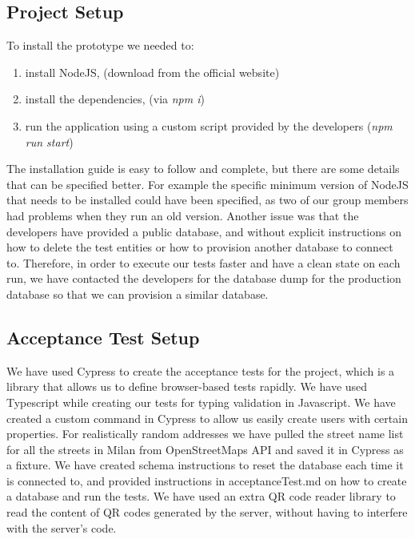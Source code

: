 \subsection{Project Setup}
To install the prototype we needed to:
\begin{enumerate}
    \item install NodeJS, (download from the official website)
    \item install the dependencies, (via \textit{npm i})
    \item run the application using a custom script provided by the developers (\textit{npm run start})
\end{enumerate}
The installation guide is easy to follow and complete, but there are some details that can be specified better.
For example the specific minimum version of NodeJS that needs to be installed could have been specified, as two of our group members had problems when they run an old version.
Another issue was that the developers have provided a public database, and without explicit instructions on how to delete the test entities or how to provision another database to connect to.
Therefore, in order to execute our tests faster and have a clean state on each run, we have contacted the developers for the database dump for the production database so that we can provision a similar database.

\subsection{Acceptance Test Setup}
We have used Cypress to create the acceptance tests for the project, which is a library that allows us to define browser-based tests rapidly.
We have used Typescript while creating our tests for typing validation in Javascript.
We have created a custom command in Cypress to allow us easily create users with certain properties.
For realistically random addresses we have pulled the street name list for all the streets in Milan from OpenStreetMaps API and saved it in Cypress as a fixture.
We have created schema instructions to reset the database each time it is connected to, and provided instructions in acceptanceTest.md on how to create a database and run the tests.
We have used an extra QR code reader library to read the content of QR codes generated by the server, without having to interfere with the server's code.
